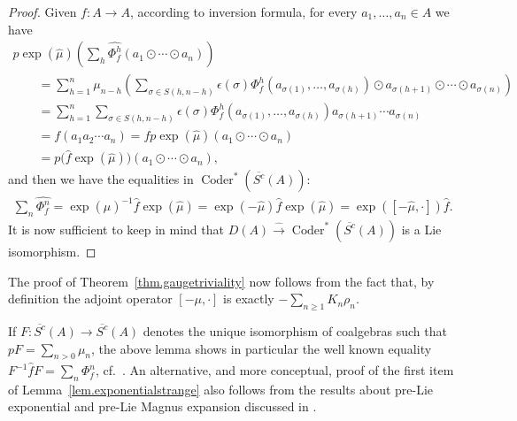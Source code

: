 \documentclass[pdftex]{sigma}
\newcommand{\Coder}{\operatorname{Coder}}
\numberwithin{equation}{section}
\begin{document}
\begin{proof}
Given $f\colon A\to A$, according to inversion formula, for every $a_1,\ldots,a_n\in A$ we have
\begin{gather*}
p\exp (\widehat{\mu})\left(\sum_h \widehat{\Phi^h_f}(a_1\odot\cdots\odot a_n)\right) \\
\qquad{}=\sum_{h=1}^n\mu_{n-h}\left(\sum_{\sigma\in S(h,n-h)}\epsilon(\sigma)
\Phi^{h}_f(a_{\sigma(1)},\ldots,a_{\sigma(h)})
\odot a_{\sigma(h+1)}\odot\cdots\odot a_{\sigma(n)}\right)\\
\qquad{}=\sum_{h=1}^n\sum_{\sigma\in S(h,n-h)}\epsilon(\sigma)
\Phi^{h}_f(a_{\sigma(1)},\ldots, a_{\sigma(h)})
a_{\sigma(h+1)}\cdots a_{\sigma(n)}\\
\qquad{}=f(a_1a_2\cdots a_n)=fp\exp(\widehat{\mu})(a_1\odot\cdots\odot a_n)\\
\qquad{} =p\big(\widehat{f}\exp(\widehat{\mu})\big)(a_1\odot\cdots\odot a_n),
\end{gather*}
and then we have the equalities in $\Coder^*(\overline{S^c}(A))$:
\begin{gather*} \sum_n\widehat{\Phi^n_f}=\exp(\widehat{\mu})^{-1}\widehat{f}\exp(\widehat{\mu})=
\exp(-\widehat{\mu})\widehat{f}\exp(\widehat{\mu})=
\exp([-\widehat{\mu},\cdot ])\widehat{f} .\end{gather*}
It is now suf\/f\/icient to keep in mind that
$D(A)\xrightarrow{\widehat{\;\;\;}} \Coder^*(\overline{S^c}(A))$ is a Lie isomorphism.
\end{proof}

The proof of Theorem~\ref{thm.gaugetriviality} now follows from the fact that, by def\/inition the adjoint operator $[-\mu, \cdot ]$ is exactly $-\sum\limits_{n\ge 1}K_n\rho_n$.

\begin{Remark}If $F\colon \overline{S^c}(A)\to \overline{S^c}(A)$ denotes the unique isomorphism of coalgebras
such that $pF=\sum\limits_{n>0}\mu_n$, the above lemma shows in particular the well known equality $F^{-1}\widehat{f}F=
\sum_n\widehat{\Phi^n_f}$, cf.~\cite{kapranovbrackets,markl2,markl1}. An alternative, and more conceptual, proof of the f\/irst item of Lemma~\ref{lem.exponentialstrange} also follows from the results about pre-Lie exponential and pre-Lie Magnus expansion
discussed in \cite[Section~4]{pLDF}.
\end{Remark}
\end{document}
